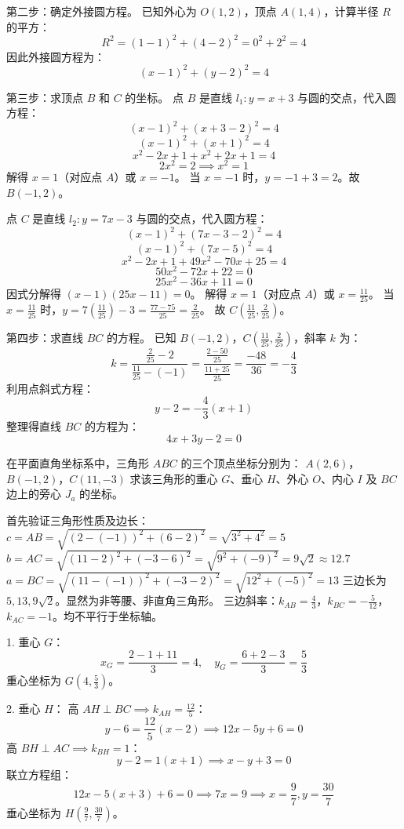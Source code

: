 \begin{questions}
\begin{solution}
第二步：确定外接圆方程。
已知外心为 $O(1, 2)$，顶点 $A(1, 4)$，计算半径 $R$ 的平方：
\[
R^2 = (1 - 1)^2 + (4 - 2)^2 = 0^2 + 2^2 = 4
\]
因此外接圆方程为：
\[
(x - 1)^2 + (y - 2)^2 = 4
\]

第三步：求顶点 $B$ 和 $C$ 的坐标。
点 $B$ 是直线 $l_{1}: y = x + 3$ 与圆的交点，代入圆方程：
\[
(x - 1)^2 + (x + 3 - 2)^2 = 4
\]
\[
(x - 1)^2 + (x + 1)^2 = 4
\]
\[
x^2 - 2x + 1 + x^2 + 2x + 1 = 4
\]
\[
2x^2 = 2 \implies x^2 = 1
\]
解得 $x = 1$（对应点 $A$）或 $x = -1$。
当 $x = -1$ 时，$y = -1 + 3 = 2$。故 $B(-1, 2)$。

点 $C$ 是直线 $l_{2}: y = 7x - 3$ 与圆的交点，代入圆方程：
\[
(x - 1)^2 + (7x - 3 - 2)^2 = 4
\]
\[
(x - 1)^2 + (7x - 5)^2 = 4
\]
\[
x^2 - 2x + 1 + 49x^2 - 70x + 25 = 4
\]
\[
50x^2 - 72x + 22 = 0
\]
\[
25x^2 - 36x + 11 = 0
\]
因式分解得 $(x - 1)(25x - 11) = 0$。
解得 $x = 1$（对应点 $A$）或 $x = \frac{11}{25}$。
当 $x = \frac{11}{25}$ 时，$y = 7(\frac{11}{25}) - 3 = \frac{77 - 75}{25} = \frac{2}{25}$。
故 $C(\frac{11}{25}, \frac{2}{25})$。

第四步：求直线 $BC$ 的方程。
已知 $B(-1, 2)$，$C(\frac{11}{25}, \frac{2}{25})$，斜率 $k$ 为：
\[
k = \frac{\frac{2}{25} - 2}{\frac{11}{25} - (-1)} = \frac{\frac{2 - 50}{25}}{\frac{11 + 25}{25}} = \frac{-48}{36} = -\frac{4}{3}
\]
利用点斜式方程：
\[
y - 2 = -\frac{4}{3}(x + 1)
\]
整理得直线 $BC$ 的方程为：
\[
4x + 3y - 2 = 0
\]
\end{solution}
    \question 在平面直角坐标系中，三角形 $ABC$ 的三个顶点坐标分别为：
$A(2, 6)$，$B(-1, 2)$，$C(11, -3)$
求该三角形的重心 $G$、垂心 $H$、外心 $O$、内心 $I$ 及 $BC$ 边上的旁心 $J_a$ 的坐标。

\begin{solution}
首先验证三角形性质及边长：
$c = AB = \sqrt{(2 - (-1))^2 + (6 - 2)^2} = \sqrt{3^2 + 4^2} = 5$
$b = AC = \sqrt{(11 - 2)^2 + (-3 - 6)^2} = \sqrt{9^2 + (-9)^2} = 9\sqrt{2} \approx 12.7$
$a = BC = \sqrt{(11 - (-1))^2 + (-3 - 2)^2} = \sqrt{12^2 + (-5)^2} = 13$
三边长为 $5, 13, 9\sqrt{2}$。显然为非等腰、非直角三角形。
三边斜率：$k_{AB} = \frac{4}{3}$，$k_{BC} = -\frac{5}{12}$，$k_{AC} = -1$。均不平行于坐标轴。

1. 重心 $G$：
\[
x_G = \frac{2 - 1 + 11}{3} = 4, \quad y_G = \frac{6 + 2 - 3}{3} = \frac{5}{3}
\]
重心坐标为 $G(4, \frac{5}{3})$。

2. 垂心 $H$：
高 $AH \perp BC \implies k_{AH} = \frac{12}{5}$：
\[
y - 6 = \frac{12}{5}(x - 2) \implies 12x - 5y + 6 = 0
\]
高 $BH \perp AC \implies k_{BH} = 1$：
\[
y - 2 = 1(x + 1) \implies x - y + 3 = 0
\]
联立方程组：
\[
12x - 5(x + 3) + 6 = 0 \implies 7x = 9 \implies x = \frac{9}{7}, y = \frac{30}{7}
\]
垂心坐标为 $H(\frac{9}{7}, \frac{30}{7})$。


\end{solution}
\end{questions}

